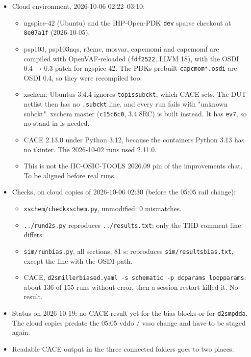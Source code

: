 \documentclass[11pt,a4paper]{article}
\providecommand{\tightlist}{\setlength{\itemsep}{0pt}\setlength{\parskip}{0pt}}
\renewcommand{\_}{\textunderscore\hspace{0pt}}
\begin{document}
\begin{itemize}
\tightlist
\item
  Cloud environment, 2026-10-06 02:22--03:10:

  \begin{itemize}
  \tightlist
  \item
    ngspice-42 (Ubuntu) and the IHP-Open-PDK
    \texttt{dev} sparse checkout at
    \texttt{8e07a1f} (2026-10-05).
  \item
    psp103, psp103\_nqs, r3\_cmc, mosvar,
    cap\_cmomi and cap\_cmomf are compiled with
    OpenVAF-reloaded (\texttt{fdf2522}, LLVM 18),
    with the OSDI 0.4 → 0.3 patch for ngspice 42.
    The PDK\textquotesingle s prebuilt
    \texttt{cap\_cmom*.osdi} are OSDI 0.4, so they
    were recompiled too.
  \item
    xschem: Ubuntu\textquotesingle s 3.4.4 ignores
    \texttt{top\_is\_subckt}, which CACE sets. The
    DUT netlist then has no \texttt{.subckt} line,
    and every run fails with "unknown subckt".
    xschem master (\texttt{c15c6c0}, 3.4.8RC) is
    built instead. It has \texttt{ev7}, so no
    stand-in is needed.
  \item
    CACE 2.13.0 under Python 3.12, because the
    container\textquotesingle s Python 3.13 has no
    tkinter. The 2026-10-02 runs used 2.11.0.
  \item
    This is not the IIC-OSIC-TOOLS 2026.09 pin of
    the improvements chat. To be aligned before
    real runs.
  \end{itemize}
\item
  Checks, on cloud copies of 2026-10-06 02:30
  (before the 05:05 rail change):

  \begin{itemize}
  \tightlist
  \item
    \texttt{xschem/check\_xschem.py}, unmodified:
    0 mismatches.
  \item
    \texttt{../run\_d2s.py} reproduces
    \texttt{../results.txt}; only the THD comment
    line differs.
  \item
    \texttt{sim/run\_bias.py}, all sections, 81 s:
    reproduces \texttt{sim/results\_bias.txt},
    except the line with the OSDI path.
  \item
    CACE,
    \texttt{d2s\_miller\_biased.yaml\ -s\ schematic\ -p\ dc\_params\ loop\_params}:
    about 136 of 155 runs without error, then a
    session restart killed it. No result.
  \end{itemize}
\item
  Status on 2026-10-19: no CACE result yet for the
  bias blocks or for \texttt{d2s\_mpdda}. The
  cloud copies predate the 05:05 vddo / vsso
  change and have to be staged again.
\item
  Readable CACE output in the three connected
  folders goes to two places:


\end{itemize}
\end{document}
